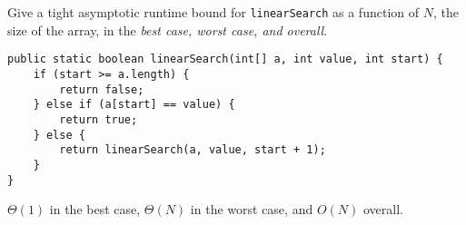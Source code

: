 \begin{blocksection}
\question Give a tight asymptotic runtime bound for \lstinline$linearSearch$ as
a function of $N$, the size of the array, in the \textit{best case, worst case,
and overall}.

\begin{lstlisting}
public static boolean linearSearch(int[] a, int value, int start) {
    if (start >= a.length) {
        return false;
    } else if (a[start] == value) {
        return true;
    } else {
        return linearSearch(a, value, start + 1);
    }
}
\end{lstlisting}

\begin{solution}[0.5in]
$\Theta(1)$ in the best case, $\Theta(N)$ in the worst case, and $O(N)$ overall.
\end{solution}
\end{blocksection}
